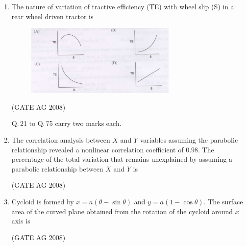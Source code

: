 \documentclass[journal,12pt,onecolumn]{IEEEtran}
\begin{document}
\begin{enumerate}
\item
 The nature of variation of tractive efficiency (TE) with wheel slip (S) in a rear wheel driven tractor is \\
\begin{figure}[h]
    \centering
    \includegraphics[width=0.7\textwidth]{Screenshot 2025-08-07 170331.png}
    \caption{}
    \label{fig 1}
\end{figure}
\hfill(GATE AG 2008)


\medskip


Q.\,21 to Q.\,75 carry two marks each.

\bigskip

\item 
 The correlation analysis between $X$ and $Y$ variables assuming the parabolic relationship revealed a nonlinear correlation coefficient of $0.98$. The percentage of the total variation that remains unexplained by assuming a parabolic relationship between $X$ and $Y$ is
\begin{enumerate}
\end{enumerate}
\hfill(GATE AG 2008)\\

\medskip

\item 
  Cycloid is formed by $x = a(\theta-\sin\theta)$ and $y = a(1-\cos\theta)$. The surface area of the curved plane obtained from the rotation of the cycloid around $x$ axis is
\begin{enumerate}
\end{enumerate}
\hfill(GATE AG 2008)\\


\end{enumerate}
\end{document}
